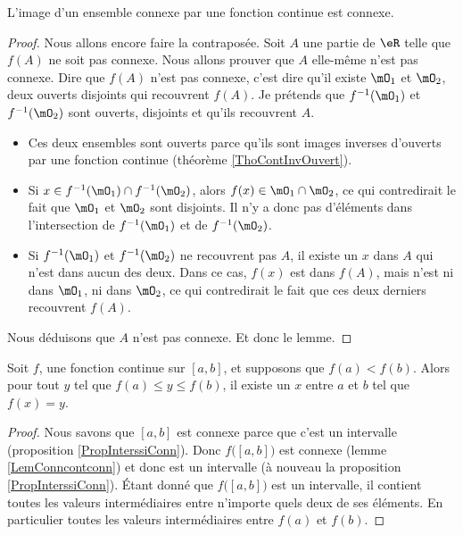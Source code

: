 \begin{lemma}   \label{LemConncontconn}
L'image d'un ensemble connexe par une fonction continue est connexe.
\end{lemma}

\begin{proof}
Nous allons encore faire la contraposée. Soit $A$ une partie de $\eR$ telle que $f(A)$ ne soit pas connexe. Nous allons prouver que $A$ elle-même n'est pas connexe. Dire que $f(A)$ n'est pas connexe, c'est dire qu'il existe $\mO_1$ et $\mO_2$, deux ouverts disjoints qui recouvrent $f(A)$. Je prétends que $f^{-1}(\mO_1)$ et $f^{-1}(\mO_2)$ sont ouverts, disjoints et qu'ils recouvrent $A$.
\begin{itemize}
\item Ces deux ensembles sont ouverts parce qu'ils sont images inverses d'ouverts par une fonction continue (théorème \ref{ThoContInvOuvert}).
\item Si $x\in f^{-1}(\mO_1)\cap f^{-1}(\mO_2)$, alors $f(x)\in \mO_1\cap\mO_2$, ce qui contredirait le fait que $\mO_1$ et $\mO_2$ sont disjoints. Il n'y a donc pas d'éléments dans l'intersection de $f^{-1}(\mO_1)$ et de $f^{-1}(\mO_2)$.
\item Si $f^{-1}(\mO_1)$ et $f^{-1}(\mO_2)$ ne recouvrent pas $A$, il existe un $x$ dans $A$ qui n'est dans aucun des deux. Dans ce cas, $f(x)$ est dans $f(A)$, mais n'est ni dans $\mO_1$, ni dans $\mO_2$, ce qui contredirait le fait que ces deux derniers recouvrent $f(A)$.
\end{itemize}
Nous déduisons que $A$ n'est pas connexe. Et donc le lemme.
\end{proof}

\begin{theorem}        \label{ThoValInter}
Soit $f$, une fonction continue sur $[a,b]$, et supposons que $f(a)<f(b)$. Alors pour tout $y$ tel que $f(a)\leq y\leq f(b)$, il existe un $x$ entre $a$ et $b$ tel que $f(x)=y$.
\end{theorem}

\begin{proof}
Nous savons que $[a,b]$ est connexe parce que c'est un intervalle (proposition \ref{PropInterssiConn}). Donc $f\big( [a,b] \big)$ est connexe (lemme \ref{LemConncontconn}) et donc est un intervalle (à nouveau la proposition \ref{PropInterssiConn}). Étant donné que $f\big( [a,b] \big)$ est un intervalle, il contient toutes les valeurs intermédiaires entre n'importe quels deux de ses éléments. En particulier toutes les valeurs intermédiaires entre $f(a)$ et $f(b)$.
\end{proof}

